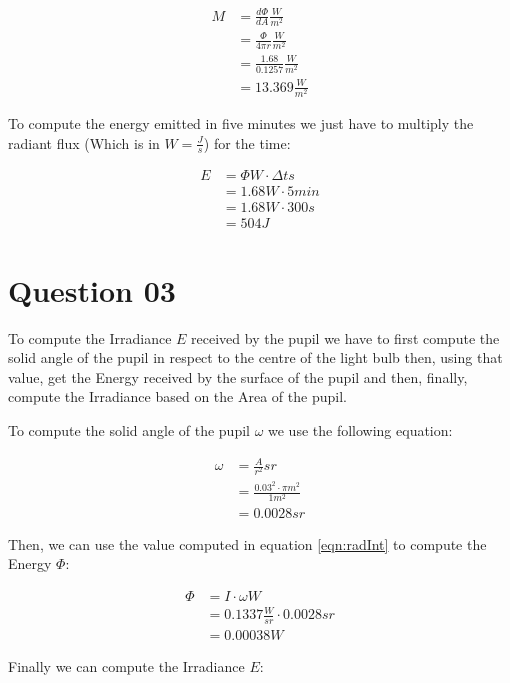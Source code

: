     \begin{align}
      M &= \frac{d\Phi}{dA}\frac{W}{m^2}    \\
        &= \frac{\Phi}{4\pi{}r}\frac{W}{m^2}\\
        &= \frac{1.68}{0.1257}\frac{W}{m^2} \\
        &= 13.369\frac{W}{m^2}
    \end{align}

    To compute the energy emitted in five minutes we just have to multiply the radiant flux (Which is in $W = \frac{J}{s}$)
    for the time:

    \begin{align}
      E &= \Phi{}W \cdot \Delta{}t s \\
        &= 1.68W \cdot 5min \\
        &= 1.68W \cdot 300s \\
        &= 504J
    \end{align}

  \section{Question 03}

    To compute the Irradiance $E$ received by the pupil we have to first compute the solid angle of the pupil in
    respect to the centre of the light bulb then, using that value, get the Energy received by the surface of the pupil
    and then, finally, compute the Irradiance based on the Area of the pupil.

    To compute the solid angle of the pupil $\omega$ we use the following equation:

    \begin{align}\label{eqn:omega}
      \omega  &= \frac{A}{r^2}sr \\
              &= \frac{0.03^2 \cdot \pi m^2}{1 m^2} \\
              &= 0.0028 sr
    \end{align}

    Then, we can use the value computed in equation \ref{eqn:radInt} to compute the Energy $\Phi$:

    \begin{align}\label{eqn:Phi}
      \Phi  &= I \cdot \omega W \\
            &= 0.1337 \frac{W}{sr} \cdot 0.0028 sr \\
            &= 0.00038 W
    \end{align}

    Finally we can compute the Irradiance $E$:

